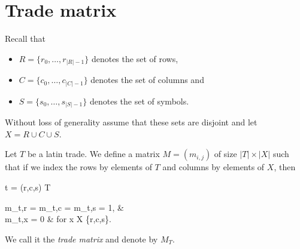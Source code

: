 \section{Trade matrix}
Recall that
\begin{itemize}
	\item $R = \{r_0,\dots,r_{|R|-1}\}$ denotes the set of rows,
	\item $C = \{c_0,\dots,c_{|C|-1}\}$ denotes the set of columns and
	\item $S = \{s_0,\dots,s_{|S|-1}\}$ denotes the set of symbols.
\end{itemize}
Without loss of generality assume that these sets are disjoint and let $X = R \cup C \cup S$.

\begin{defn}
Let $T$ be a latin trade. We define a matrix $M = (m_{i,j})$ of size $|T| \times |X|$ such that if we index the rows by elements of $T$ and columns by elements of $X$, then
\begin{cosyeqnarray}
	t = (r,c,s) \in T \Rightarrow
	\begin{cases}
		m_{t,r} = m_{t,c} = m_{t,s} = 1, & \\
		m_{t,x} = 0 & \textrm{ for } x \in X \setminus \{r,c,s\}.
	\end{cases}
\end{cosyeqnarray}%
\end{defn}
We call it the \emph{trade matrix} and denote by $M_T$.

